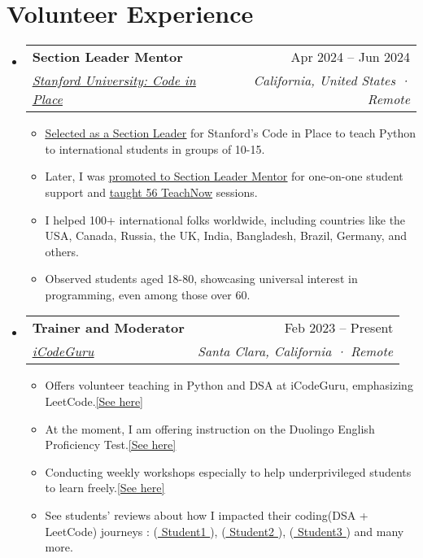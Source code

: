 \documentclass[letterpaper,11pt]{article}
\makeatletter
\newcommand{\resumeItem}[1]{
  \item\small{
    {#1 \vspace{-2pt}}
  }
}
\newcommand{\resumeSubheading}[4]{
  \vspace{-2pt}\item
    \begin{tabular*}{0.97\textwidth}[t]{l@{\extracolsep{\fill}}r}
      \textbf{#1} & #2 \\
      \textit{\small#3} & \textit{\small #4} \\
    \end{tabular*}\vspace{-7pt}
}
\newcommand{\resumeSubHeadingListStart}{\begin{itemize}[leftmargin=0.15in, label={}]}
\newcommand{\resumeSubHeadingListEnd}{\end{itemize}}
\newcommand{\resumeItemListStart}{\begin{itemize}}
\newcommand{\resumeItemListEnd}{\end{itemize}\vspace{-5pt}}
\makeatother
\begin{document}
\section{\textbf{Volunteer Experience}}
\resumeSubHeadingListStart
\resumeSubheading
{Section Leader Mentor}{Apr 2024 -- Jun 2024}
{{\href{https://codeinplace.stanford.edu/}{\underline{Stanford University: Code in Place}}}}{California, United States · Remote}
\resumeItemListStart
\resumeItem{{\href{https://www.linkedin.com/feed/update/urn:li:activity:7186385467846639620/}{\underline{Selected as a Section Leader}}} for Stanford's Code in Place to teach Python to international students in groups of 10-15.}
\resumeItem{Later, I was {\href{https://www.linkedin.com/posts/ahmad-jajja_stanfordabrcodeabrinabrplaceabrlearnings-activity-7195142429073633281-zNhV?utm_source=share&utm_medium=member_desktop}{\underline{promoted to Section Leader Mentor}}} for one-on-one student support and {\href{https://www.linkedin.com/feed/update/urn:li:activity:7204425552311541760/}{\underline{taught 56 TeachNow}}} sessions.}
\resumeItem{ I helped 100+ international folks worldwide, including countries like the USA, Canada, Russia, the UK, India, Bangladesh, Brazil, Germany, and others.}
\resumeItem{ Observed students aged 18-80, showcasing universal interest in programming, even among those over 60.}
\resumeItemListEnd
\resumeSubheading
{Trainer and Moderator}{Feb 2023 -- Present}
{{\href{https://www.linkedin.com/company/icode-guru/mycompany/}{\underline{iCodeGuru}}}}{Santa Clara, California · Remote}
\resumeItemListStart
\resumeItem{Offers volunteer teaching in Python and DSA at iCodeGuru, emphasizing LeetCode.{\href{https://github.com/Ahmadjajja/LeetCode_Volunteer_Teaching}{\underline{[See here]}}}}
\resumeItem{At the moment, I am offering instruction on the Duolingo English Proficiency Test.{\href{https://www.linkedin.com/feed/update/urn:li:activity:7169346246216671232/}{\underline{[See here]}}}}
\resumeItem{Conducting weekly workshops especially to help underprivileged students to learn freely.{\href{https://github.com/Ahmadjajja/LeetCode_Volunteer_Teaching}{\underline{[See here]}}}}
\resumeItem{See students' reviews about how I impacted their coding(DSA + LeetCode) journeys : ({\href{https://www.linkedin.com/posts/sikander-nawaz_dsa-dsa-leetcode-activity-7170805639886106624-Kxka?utm_source=share&utm_medium=member_desktop}{\underline{ Student1 }}}), ({\href{https://www.linkedin.com/posts/syedshahzilimran_mastering-trees-unlocking-the-key-of-dsa-activity-7174974045019398144-DN_C?utm_source=share&utm_medium=member_desktop}{\underline{ Student2 }}}), ({\href{https://www.linkedin.com/feed/update/urn:li:activity:7173635314391920640/}{\underline{ Student3 }}}) and many more. }
\resumeItemListEnd
\resumeSubHeadingListEnd
%
\end{document}

